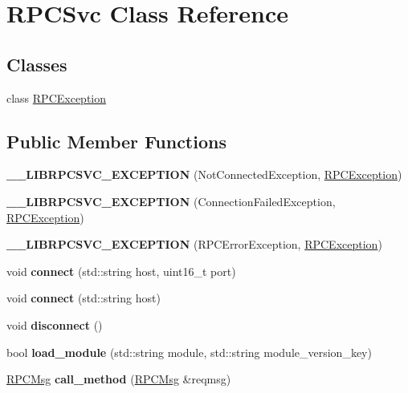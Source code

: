 \hypertarget{classRPCSvc}{
\section{RPCSvc Class Reference}
\label{classRPCSvc}
}
\subsection*{Classes}
\begin{DoxyCompactItemize}
\item 
class \hyperlink{classRPCSvc_1_1RPCException}{RPCException}
\end{DoxyCompactItemize}
\subsection*{Public Member Functions}
\begin{DoxyCompactItemize}
\item 
\hypertarget{classRPCSvc_a0f0ddd040baee67029f0ecbc44d144eb}{
{\bfseries \_\-\_\-LIBRPCSVC\_\-EXCEPTION} (NotConnectedException, \hyperlink{classRPCSvc_1_1RPCException}{RPCException})}
\label{classRPCSvc_a0f0ddd040baee67029f0ecbc44d144eb}

\item 
\hypertarget{classRPCSvc_a64560b6a5cb979e8f681bb93386e15fa}{
{\bfseries \_\-\_\-LIBRPCSVC\_\-EXCEPTION} (ConnectionFailedException, \hyperlink{classRPCSvc_1_1RPCException}{RPCException})}
\label{classRPCSvc_a64560b6a5cb979e8f681bb93386e15fa}

\item 
\hypertarget{classRPCSvc_ab4d39e45e20c3290ab69e1d77be1244e}{
{\bfseries \_\-\_\-LIBRPCSVC\_\-EXCEPTION} (RPCErrorException, \hyperlink{classRPCSvc_1_1RPCException}{RPCException})}
\label{classRPCSvc_ab4d39e45e20c3290ab69e1d77be1244e}

\item 
\hypertarget{classRPCSvc_ab4d1e3a15000655e5ad6660caa3b03da}{
void {\bfseries connect} (std::string host, uint16\_\-t port)}
\label{classRPCSvc_ab4d1e3a15000655e5ad6660caa3b03da}

\item 
\hypertarget{classRPCSvc_a838777c9c22a0ecd895fd2a28f789eee}{
void {\bfseries connect} (std::string host)}
\label{classRPCSvc_a838777c9c22a0ecd895fd2a28f789eee}

\item 
\hypertarget{classRPCSvc_ad8cb3a0dcfcd8ed574cfd45fbb638c86}{
void {\bfseries disconnect} ()}
\label{classRPCSvc_ad8cb3a0dcfcd8ed574cfd45fbb638c86}

\item 
\hypertarget{classRPCSvc_a474a38ca627f6bde10dbeac89f3eea1b}{
bool {\bfseries load\_\-module} (std::string module, std::string module\_\-version\_\-key)}
\label{classRPCSvc_a474a38ca627f6bde10dbeac89f3eea1b}

\item 
\hypertarget{classRPCSvc_ade706ced464b3d5280cb12b9b59ef3b7}{
\hyperlink{classRPCMsg}{RPCMsg} {\bfseries call\_\-method} (\hyperlink{classRPCMsg}{RPCMsg} \&reqmsg)}
\label{classRPCSvc_ade706ced464b3d5280cb12b9b59ef3b7}

\end{DoxyCompactItemize}
